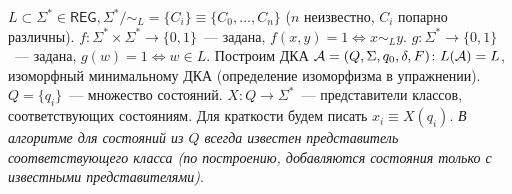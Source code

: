 \documentclass[a4paper]{article}
\def\A{{\cal A}}
\def\REG{{\mathsf{REG}}}
\begin{document}
$L\subset\Sigma^*\in\REG,\Sigma^*/\sim_L=\{C_i\}\equiv\{C_0,...,C_n\}$ ($n$ неизвестно, $C_i$ попарно различны).\newline
$f\colon \Sigma^*\times\Sigma^*\longrightarrow\{0,1\}$~--- задана, $f(x,y)=1\Leftrightarrow x\sim_Ly$. $g\colon \Sigma^*\longrightarrow\{0,1\}$~--- задана, $g(w)=1\Leftrightarrow w\in L$.\newline
Построим ДКА $\A=(Q,\Sigma,q_0,\delta,F)\colon L(\A)=L$, изоморфный минимальному ДКА (определение изоморфизма в упражнении).\newline
$Q=\{q_i\}$~--- множество состояний.\newline
$X\colon Q\longrightarrow \Sigma^*$~--- представители классов, соответствующих состояниям. Для краткости будем писать $x_i\equiv X(q_i)$.\newline
{\em В алгоритме для состояний из $Q$ всегда известен представитель соответствующего класса (по построению, добавляются состояния только с известными представителями)}.
\end{document}
